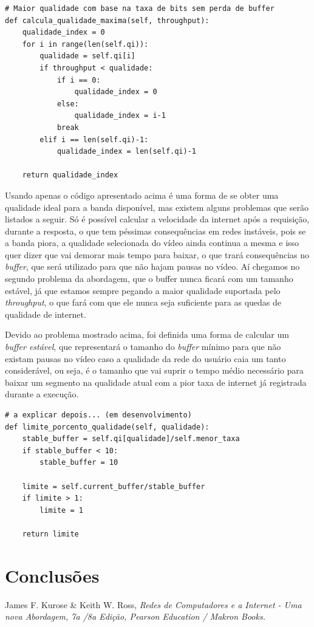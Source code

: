 \documentclass[12pt]{article}
\begin{document}
\begin{lstlisting}
# Maior qualidade com base na taxa de bits sem perda de buffer
def calcula_qualidade_maxima(self, throughput):
    qualidade_index = 0
    for i in range(len(self.qi)):
        qualidade = self.qi[i]
        if throughput < qualidade:
            if i == 0:
                qualidade_index = 0
            else:
                qualidade_index = i-1
            break
        elif i == len(self.qi)-1:
            qualidade_index = len(self.qi)-1

    return qualidade_index
\end{lstlisting}

Usando apenas o código apresentado acima é uma forma de se obter uma qualidade ideal para a banda disponível, mas existem alguns problemas que serão listados a seguir. Só é possível calcular a velocidade da internet após a requisição, durante a resposta, o que tem péssimas consequências em redes instáveis, pois se a banda piora, a qualidade selecionada do vídeo ainda continua a mesma e isso quer dizer que vai demorar mais tempo para baixar, o que trará consequências no \textit{buffer}, que será utilizado para que não hajam pausas no vídeo. Aí chegamos no segundo problema da abordagem, que o buffer nunca ficará com um tamanho estável, já que estamos sempre pegando a maior qualidade suportada pelo \textit{throughput}, o que fará com que ele nunca seja suficiente para as quedas de qualidade de internet.

Devido ao problema mostrado acima, foi definida uma forma de calcular um \textit{buffer estável}, que representará o tamanho do \textit{buffer} mínimo para que não existam pausas no vídeo caso a qualidade da rede do usuário caia um tanto considerável, ou seja, é o tamanho que vai suprir o tempo médio necessário para baixar um segmento na qualidade atual com a pior taxa de internet já registrada durante a execução.

\begin{lstlisting}
# a explicar depois... (em desenvolvimento)
def limite_porcento_qualidade(self, qualidade):
    stable_buffer = self.qi[qualidade]/self.menor_taxa
    if stable_buffer < 10:
        stable_buffer = 10

    limite = self.current_buffer/stable_buffer
    if limite > 1:
        limite = 1

    return limite
\end{lstlisting}

\section{Conclusões}
\lipsum[3]

\begin{thebibliography}{9}

\noindent James F. Kurose \& Keith W. Ross, 
\textit{Redes de Computadores e a Internet - Uma nova Abordagem, 7a /8a Edição, Pearson Education / Makron Books.}

\end{thebibliography}
\end{document}
